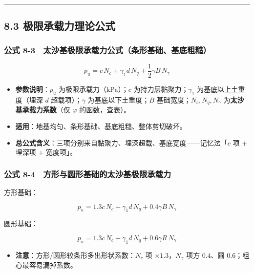 \documentclass[
]{article}
\providecommand{\tightlist}{%
  \setlength{\itemsep}{0pt}\setlength{\parskip}{0pt}}
\begin{document}
\begin{center}\rule{0.5\linewidth}{0.5pt}\end{center}

\subsection{8.3
极限承载力理论公式}\label{ux6781ux9650ux627fux8f7dux529bux7406ux8bbaux516cux5f0f}

\subsubsection{公式
8-3　太沙基极限承载力公式（条形基础、基底粗糙）}\label{ux516cux5f0f-8-3-ux592aux6c99ux57faux6781ux9650ux627fux8f7dux529bux516cux5f0fux6761ux5f62ux57faux7840ux57faux5e95ux7c97ux7cd9}

\[\boxed{p_u=c\,N_c+\gamma_1 d\,N_q+\frac{1}{2}\gamma B\,N_\gamma}\]

\begin{itemize}
\tightlist
\item
  \textbf{参数说明}：\(p_u\) 为极限承载力（\(\mathrm{kPa}\)）；\(c\)
  为持力层黏聚力；\(\gamma_1\) 为基底以上土重度（埋深 \(d\)
  超载项）；\(\gamma\) 为基底以下土重度；\(B\)
  基础宽度；\(N_c,N_q,N_\gamma\) 为\textbf{太沙基承载力系数}（仅
  \(\varphi\) 的函数，查表）。
\item
  \textbf{适用}：地基均匀、条形基础、基底粗糙、整体剪切破坏。
\item
  \textbf{总公式含义}：三项分别来自黏聚力、埋深超载、基底宽度------记忆法「\(c\)
  项 + 埋深项 + 宽度项」。
\end{itemize}

\subsubsection{公式
8-4　方形与圆形基础的太沙基极限承载力}\label{ux516cux5f0f-8-4-ux65b9ux5f62ux4e0eux5706ux5f62ux57faux7840ux7684ux592aux6c99ux57faux6781ux9650ux627fux8f7dux529b}

方形基础：

\[p_u=1.3c\,N_c+\gamma_1 d\,N_q+0.4\gamma B\,N_\gamma\]

圆形基础：

\[p_u=1.3c\,N_c+\gamma_1 d\,N_q+0.6\gamma R\,N_\gamma\]

\begin{itemize}
\tightlist
\item
  \textbf{注意}：方形/圆形较条形多出形状系数：\(N_c\) 项
  \(\times1.3\)，\(N_\gamma\) 项方 \(0.4\)、圆
  \(0.6\)；粗心最容易漏掉系数。
\end{itemize}
\end{document}
